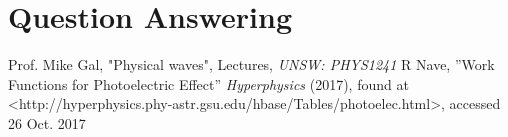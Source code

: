 \documentclass[paper=a4, fontsize=12pt]{scrartcl}
\begin{document}
\section{Question Answering}




\clearpage

\begin{thebibliography}{99}
 Prof. Mike Gal, "Physical waves", Lectures, {\em UNSW: PHYS1241}
 R Nave, ''Work Functions for Photoelectric Effect'' {\em Hyperphysics} (2017), found at <http://hyperphysics.phy-astr.gsu.edu/hbase/Tables/photoelec.html>, accessed 26 Oct. 2017

\end{thebibliography}
\end{document}
